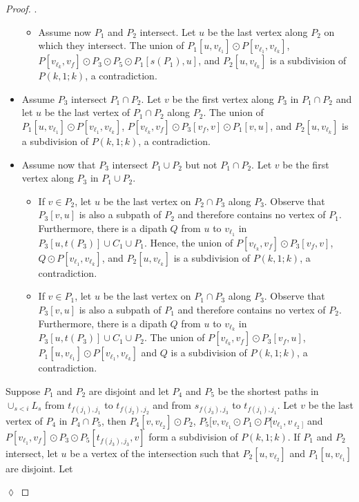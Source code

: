 \documentclass[utf8,10pt]{article}
\theoremstyle{plain}
\theoremstyle{definition}
\theoremstyle{remark}
\newenvironment{subproof}{\par\noindent {\it Subproof}.\ }{\hfill$\lozenge$\par\vspace{11pt}}
\begin{document}
\begin{proof}
\begin{subproof}
\begin{itemize}
\begin{itemize}
		\item Assume now $P_1$ and $P_2$ intersect. Let $u$ be the last vertex along $P_2$ on which they intersect.
		 The union of $P_1[u,v_{\ell_1}]\odot P[v_{\ell_1}, v_{\ell_k}]$, $P[v_{\ell_k}, v_f]\odot P_3\odot P_5 \odot P_1[s(P_1), u]$, and $P_2[u, v_{\ell_k}]$ is a subdivision of $P(k,1;k)$, a contradiction.
	\end{itemize}

	\item Assume $P_3$ intersect $P_1\cap P_2$. Let $v$ be the first vertex along $P_3$ in $P_1\cap P_2$ and let $u$ be the last vertex of $P_1\cap P_2$ along $P_2$. The union of $P_1[u,v_{\ell_1}]\odot P[v_{\ell_1}, v_{\ell_k}]$, $P[v_{\ell_k}, v_f]\odot P_3[v_f,v]\odot P_1[v, u]$, and $P_2[u, v_{\ell_k}]$ is a subdivision of $P(k,1;k)$, a contradiction.

	\item Assume now that $P_3$ intersect $P_1\cup P_2$ but not $P_1\cap P_2$. Let $v$ be the first vertex along $P_3$ in $P_1\cup P_2$.
	\begin{itemize}
	\item If $v \in P_2$, let $u$ be the last vertex on $P_2\cap P_3$ along $P_3$. Observe that $P_3[v,u]$ is also a subpath of $P_2$ and therefore contains no vertex of $P_1$. Furthermore, there is a dipath $Q$ from $u$ to $v_{\ell_1}$ in $P_3[u, t(P_3)]\cup C_1\cup  P_1$. Hence, the union of $P[v_{\ell_k}, v_f] \odot P_3[v_f,v]$, $Q\odot P[v_{\ell_1},v_{\ell_k}]$, and $P_2[u,v_{\ell_k}]$ is a subdivision of $P(k,1;k)$, a contradiction.
	
	\item If $v\in P_1$, let $u$ be the last vertex on $P_1\cap P_3$ along $P_3$.  Observe that $P_3[v,u]$ is also a subpath of $P_1$ and therefore contains no vertex of $P_2$. Furthermore, there is a dipath $Q$ from $u$ to $v_{\ell_k}$ in $P_3[u, t(P_3)]\cup C_1\cup  P_2$.
	The union of $P[v_{\ell_k}, v_f] \odot P_3[v_f,u]$, $P_1[u, v_{\ell_1}]\odot P[v_{\ell_1}, v_{\ell_k}]$ and $Q$ is a subdivision of $P(k,1;k)$, a contradiction.

	\end{itemize}

\end{itemize}

Suppose $P_1$ and $P_2$ are disjoint and let $P_4$ and $P_5$ be the shortest paths in $\cup_{s < i} L_s$ 
from $t_{f(j_1),j_1}$ to $t_{f(j_2),j_2}$
and from $s_{f(j_3),j_3}$ to $t_{f(j_1),j_1}$. Let $v$ be the last vertex of $P_4$ in $P_4 \cap P_5$, then $P_4[v,v_{\ell_2}] \odot P_2$,
$P_5[v, v_{\ell_1} \odot P_1 \odot P[v_{\ell_1}, v_{\ell_2]}$ and $P[v_{\ell_1}, v_f] \odot P_3 \odot P_5[t_{f(j_3),j_3}, v]$
form a subdivision of $P(k,1;k)$.
If $P_1$ and $P_2$ intersect, let $u$ be a vertex of the intersection such that $P_2[u, v_{\ell_2}]$ and $P_1[u, v_{\ell_1}]$ are disjoint.
Let%




\end{subproof}
\end{proof}
\end{document}
